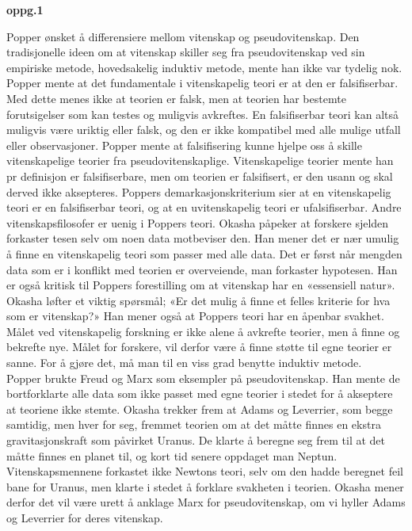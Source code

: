 \documentclass[
  letterpaper,
  DIV=11,
  numbers=noendperiod]{scrreprt}
\begin{document}
\textbf{oppg.1}

Popper ønsket å differensiere mellom vitenskap og pseudovitenskap. Den
tradisjonelle ideen om at vitenskap skiller seg fra pseudovitenskap ved
sin empiriske metode, hovedsakelig induktiv metode, mente han ikke var
tydelig nok. Popper mente at det fundamentale i vitenskapelig teori er
at den er falsifiserbar. Med dette menes ikke at teorien er falsk, men
at teorien har bestemte forutsigelser som kan testes og muligvis
avkreftes. En falsifiserbar teori kan altså muligvis være uriktig eller
falsk, og den er ikke kompatibel med alle mulige utfall eller
observasjoner. Popper mente at falsifisering kunne hjelpe oss å skille
vitenskapelige teorier fra pseudovitenskaplige. Vitenskapelige teorier
mente han pr definisjon er falsifiserbare, men om teorien er
falsifisert, er den usann og skal derved ikke aksepteres. Poppers
demarkasjonskriterium sier at en vitenskapelig teori er en falsifiserbar
teori, og at en uvitenskapelig teori er ufalsifiserbar. Andre
vitenskapsfilosofer er uenig i Poppers teori. Okasha påpeker at forskere
sjelden forkaster tesen selv om noen data motbeviser den. Han mener det
er nær umulig å finne en vitenskapelig teori som passer med alle data.
Det er først når mengden data som er i konflikt med teorien er
overveiende, man forkaster hypotesen. Han er også kritisk til Poppers
forestilling om at vitenskap har en «essensiell natur». Okasha løfter et
viktig spørsmål; «Er det mulig å finne et felles kriterie for hva som er
vitenskap?» Han mener også at Poppers teori har en åpenbar svakhet.
Målet ved vitenskapelig forskning er ikke alene å avkrefte teorier, men
å finne og bekrefte nye. Målet for forskere, vil derfor være å finne
støtte til egne teorier er sanne. For å gjøre det, må man til en viss
grad benytte induktiv metode.\\

Popper brukte Freud og Marx som eksempler på pseudovitenskap. Han mente
de bortforklarte alle data som ikke passet med egne teorier i stedet for
å akseptere at teoriene ikke stemte. Okasha trekker frem at Adams og
Leverrier, som begge samtidig, men hver for seg, fremmet teorien om at
det måtte finnes en ekstra gravitasjonskraft som påvirket Uranus. De
klarte å beregne seg frem til at det måtte finnes en planet til, og kort
tid senere oppdaget man Neptun. Vitenskapsmennene forkastet ikke Newtons
teori, selv om den hadde beregnet feil bane for Uranus, men klarte i
stedet å forklare svakheten i teorien. Okasha mener derfor det vil være
urett å anklage Marx for pseudovitenskap, om vi hyller Adams og
Leverrier for deres vitenskap.
\end{document}
